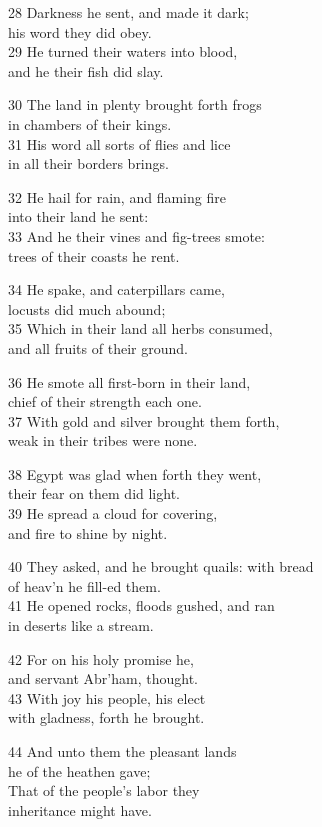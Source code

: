 28 Darkness he sent, and made it dark;\\
his word they did obey.\\
29 He turned their waters into blood,\\
and he their fish did slay.

30 The land in plenty brought forth frogs\\
in chambers of their kings.\\
31 His word all sorts of flies and lice\\
in all their borders brings.

32 He hail for rain, and flaming fire\\
into their land he sent:\\
33 And he their vines and fig-trees smote:\\
trees of their coasts he rent.

34 He spake, and caterpillars came,\\
locusts did much abound;\\
35 Which in their land all herbs consumed,\\
and all fruits of their ground.

36 He smote all first-born in their land,\\
chief of their strength each one.\\
37 With gold and silver brought them forth,\\
weak in their tribes were none.

38 Egypt was glad when forth they went,\\
their fear on them did light.\\
39 He spread a cloud for covering,\\
and fire to shine by night.

40 They asked, and he brought quails: with bread\\
of heav’n he fill-ed them.\\
41 He opened rocks, floods gushed, and ran\\
in deserts like a stream.

42 For on his holy promise he,\\
and servant Abr’ham, thought.\\
43 With joy his people, his elect\\
with gladness, forth he brought.

44 And unto them the pleasant lands\\
he of the heathen gave;\\
That of the people’s labor they\\
inheritance might have.

